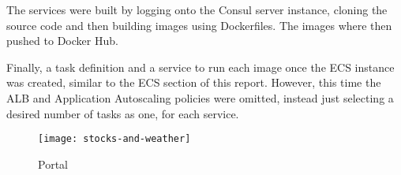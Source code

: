The services were built by logging onto the Consul server instance, cloning the source code and then building images using Dockerfiles. The images where then pushed to Docker Hub.

Finally, a task definition and a service to run each image once the ECS instance was created, similar to the ECS section of this report. However, this time the ALB and Application Autoscaling policies were omitted, instead just selecting a desired number of tasks as one, for each service.

\begin{figure}[H]
	\setlength{\belowcaptionskip}{15pt plus 3pt minus 2pt}
	\caption{Portal}
	\centering
	\texttt{[image: stocks-and-weather]}
	\label{fig:rabbit}
\end{figure}